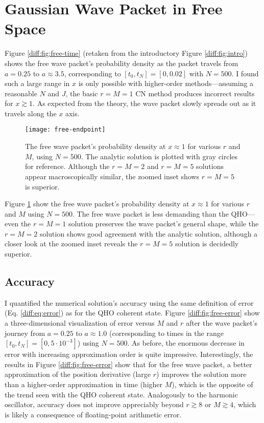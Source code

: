\documentclass[11pt, a4paper]{article}
\begin{document}
\section{Gaussian Wave Packet in Free Space}
Figure \ref{diff:fig:free-time} (retaken from the introductory Figure \ref{diff:fig:intro}) shows the free wave packet's probability density as the packet travels from $ a = 0.25 $ to $ a \approx 3.5 $, corresponding to $ [t_{0}, t_{N}] = [0, 0.02] $ with $ N = 500 $. I found such a large range in $ x $ is only possible with higher-order methods---assuming a reasonable $ N $ and $ J $, the basic $ r = M = 1 $ CN method produces incorrect results for $ x \gtrsim 1 $. As expected from the theory, the wave packet slowly spreads out as it travels along the $ x $ axis.

\begin{figure}[htb!]
\centering
\texttt{[image: free-endpoint]}
\caption{The free wave packet's probability density at $ x \approx 1 $ for various $ r $ and $ M $, using $ N = 500 $. The analytic solution is plotted with gray circles for reference. Although the $ r = M = 2 $ and $ r = M = 5 $ solutions appear macroscopically similar, the zoomed inset shows $ r = M = 5 $ is superior.}
\label{diff:fig:free-endpoint}
\end{figure}


Figure \ref{diff:fig:free-endpoint} show the free wave packet's probability density at $ x \approx 1 $ for various $ r $ and $ M $ using $ N = 500 $. The free wave packet is less demanding than the QHO---even the $ r = M = 1 $ solution preserves the wave packet's general shape, while the $ r = M = 2 $ solution shows good agreement with the analytic solution, although a closer look at the zoomed inset reveals the $ r = M = 5 $ solution is decidedly superior. 


\subsection{Accuracy}
I quantified the numerical solution's accuracy using the same definition of error (Eq. \ref{diff:eq:error}) as for the QHO coherent state. Figure \ref{diff:fig:free-error} show a three-dimensional visualization of error versus $ M $ and $ r $ after the wave packet's journey from $ a = 0.25 $ to $ a \approx 1.0 $ (corresponding to times in the range $ [t_{0}, t_{N}] = [0, 5\cdot 10^{-3}] $) using $ N = 500 $. As before, the enormous decrease in error with increasing approximation order is quite impressive. Interestingly, the results in Figure \ref{diff:fig:free-error} show that for the free wave packet, a better approximation of the position derivative (large $ r $) improves the solution more than a higher-order approximation in time (higher $ M $), which is the opposite of the trend seen with the QHO coherent state. Analogously to the harmonic oscillator, accuracy does not improve appreciably beyond $ r \gtrsim 8 $ or $ M \gtrsim 4 $, which is likely a consequence of floating-point arithmetic error.
\end{document}
